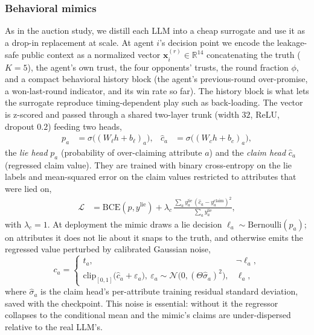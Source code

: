 \subsubsection{Behavioral mimics}
\label{sec:dec-r-mimics}
As in the auction study, we distill each LLM into a cheap surrogate and use it as
a drop-in replacement at scale. At agent $i$'s decision point we encode the
leakage-safe public context as a normalized vector
$\mathbf{x}_i^{(r)}\in\mathbb{R}^{14}$ concatenating the truth ($K=5$), the
agent's own trust, the four opponents' trusts, the round fraction $\phi$, and a
compact behavioral history block (the agent's previous-round over-promise, a
won-last-round indicator, and its win rate so far). The history block is what
lets the surrogate reproduce timing-dependent play such as back-loading. The
vector is z-scored and passed through a shared two-layer trunk (width $32$,
ReLU, dropout $0.2$) feeding two heads,
\begin{align}
p_a &= \sigma\!\bigl((W_\ell h + b_\ell)_a\bigr), &
\hat{c}_a &= \sigma\!\bigl((W_c h + b_c)_a\bigr),
\label{eq:dec-r-heads}
\end{align}
the \emph{lie head} $p_a$ (probability of over-claiming attribute $a$) and the
\emph{claim head} $\hat{c}_a$ (regressed claim value). They are trained with
binary cross-entropy on the lie labels and mean-squared error on the claim values
restricted to attributes that were lied on,
\begin{equation}
\begin{aligned}
\mathcal{L} &= \mathrm{BCE}(p, y^{\mathrm{lie}})
 + \lambda_c\,\frac{\sum_a y^{\mathrm{lie}}_a\,(\hat{c}_a - y^{\mathrm{claim}}_a)^2}{\sum_a y^{\mathrm{lie}}_a},
\end{aligned}
\label{eq:dec-r-loss}
\end{equation}
with $\lambda_c=1$. At deployment the mimic draws a lie decision
$\ell_a\sim\mathrm{Bernoulli}(p_a)$; on attributes it does not lie about it snaps
to the truth, and otherwise emits the regressed value perturbed by calibrated
Gaussian noise,
\begin{equation}
c_a =
\begin{cases}
t_a, & \neg\ell_a,\\[2pt]
\mathrm{clip}_{[0,1]}\!\bigl(\hat{c}_a + \varepsilon_a\bigr),\ \varepsilon_a\sim\mathcal{N}\!\bigl(0,(\Theta\hat{\sigma}_a)^2\bigr), & \ell_a,
\end{cases}
\label{eq:dec-r-infer}
\end{equation}
where $\hat{\sigma}_a$ is the claim head's per-attribute training residual
standard deviation, saved with the checkpoint. This noise is essential: without
it the regressor collapses to the conditional mean and the mimic's claims are
under-dispersed relative to the real LLM's.

